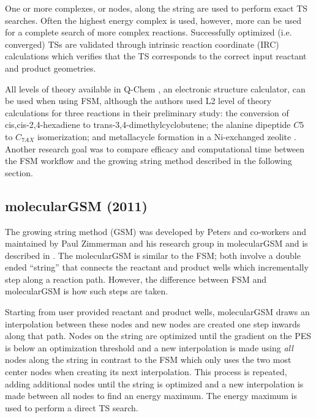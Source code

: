 \documentclass[preprint, 11pt]{elsarticle} %
\begin{document}
One or more complexes, or nodes, along the string are used to perform exact TS searches.
Often the highest energy complex is used, however, more can be used for a complete search of more complex reactions. 
Successfully optimized (i.e. converged) TSs are validated through intrinsic reaction coordinate (IRC) calculations \cite{Maeda:2015} which verifies that the TS corresponds to the correct input reactant and product geometries. 

All levels of theory available in Q-Chem \cite{QChem:2015}, an electronic structure calculator, can be used when using FSM, although the authors used L2 level of theory calculations for three reactions in their preliminary study: the conversion of cis,cis-2,4-hexadiene to trans-3,4-dimethylcyclobutene; the alanine dipeptide $C5$ to $C_{7AX}$ isomerization; and metallacycle formation in a Ni-exchanged zeolite \cite{Behn:2011}. %
Another research goal was to compare efficacy and computational time between the FSM workflow and the growing string method described in the following section.

\subsection{molecularGSM (2011)}

The growing string method (GSM) was developed by Peters and co-workers \cite{Peters:2004} and maintained by Paul Zimmerman and his research group in molecularGSM \cite{Zimmerman:2013jctc,Zimmerman:2013jcp, Zimmerman:2015jcc} and is described in .
The molecularGSM is similar to the FSM; both involve a double ended ``string'' that connects the reactant and product wells which incrementally step along a reaction path.
However, the difference between FSM and molecularGSM is how such steps are taken. 

Starting from user provided reactant and product wells, molecularGSM draws an interpolation between these nodes and new nodes are created one step inwards along that path. 
Nodes on the string are optimized until the gradient on the PES is below an optimization threshold and a new interpolation is made using \textit{all} nodes along the string in contrast to the FSM which only uses the two most center nodes when creating its next interpolation.
This process is repeated, adding additional nodes until the string is optimized and a new interpolation is made between all nodes to find an energy maximum. 
The energy maximum is used to perform a direct TS search.
\end{document}
